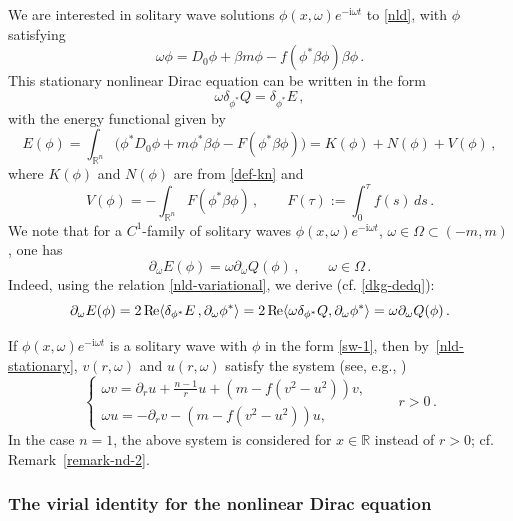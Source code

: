 \documentclass[12pt]{extarticle}
\newcommand{\jj}{\mathrm{i}}
\newcommand{\p}{\partial}
\def\R{\mathbb{R}}
\theoremstyle{plain}
\theoremstyle{remark}
\renewcommand{\Re}{\mathop{\rm{R\hskip -1pt e}}\nolimits}
\begin{document}
We are interested in solitary wave solutions
$\phi(x,\omega)e^{-\jj\omega t}$
to \eqref{nld},
with $\phi$ satisfying
\begin{equation}\label{nld-stationary}
    \omega\phi=D_0\phi+\beta m\phi-f( \phi^*\beta\phi)\beta\phi\,.
\end{equation}
This stationary nonlinear Dirac equation
can be written in the form
\begin{equation}\label{nld-variational}
    \omega\delta_{\phi^*}Q = \delta_{\phi^*}E\,,
\end{equation}
with the energy functional
given by
\begin{equation}\label{def-E}
    E(\phi)
    =\int_{\R^n}
    \bigl(
    \phi^* D_0\phi
    +m \phi^*\beta\phi
    -F( \phi^*\beta\phi)
    \bigr)
    =K(\phi)+N(\phi)+V(\phi)\,,
\end{equation}
where
$K(\phi)$ and $N(\phi)$ are from
\eqref{def-kn}
and
\[
    V(\phi)
    =-\int_{\R^n}
    F( \phi^*\beta\phi)\,,
    \qquad
    F(\tau):=\int_0^\tau f(s)\,ds\,.
\]
We note that
for a $C^1$-family of solitary waves
$\phi(x,\omega)e^{-\jj\omega t}$,
$\omega\in\Omega\subset(-m,m)$,
one has
\[
    \p_\omega E(\phi) = \omega \p_\omega Q(\phi)\,,
    \qquad
    \omega\in\Omega\,.
\]
Indeed, using the relation
\eqref{nld-variational},
we derive (cf. \eqref{dkg-dedq}):
\[
    \p_\omega E(\phi)
    =
    2\Re\langle\delta_{\phi^*}E\,,
    \p_\omega
    \phi^*\rangle
    =2 \Re\langle\omega\delta_{\phi^*}Q,\p_\omega\phi^*\rangle
    =
    \omega\p_\omega Q(\phi)\,.
\]

If $\phi(x,\omega)e^{-\jj\omega t}$
is a solitary wave
with $\phi$ in the form \eqref{sw-1},
then by~\eqref{nld-stationary},
$v(r,\omega)$ and $u(r,\omega)$ satisfy the system
(see, e.g.,
\cite{esteban1995stationary,boussaid2017nonrelativistic})
\begin{equation}\label{nld-stationary-1}
    \begin{cases}
        \omega v=\p_r u+\frac{n-1}{r}u+(m-f(v^2-u^2))v, \\
        \omega u=-\p_r v-(m-f(v^2-u^2))u,
    \end{cases}
    \qquad
    r>0\,.
\end{equation}
In the case $n=1$,
the above system is considered
for $x\in\R$ instead of $r>0$;
cf. Remark~\ref{remark-nd-2}.

\subsubsection*{The virial identity
for the nonlinear Dirac equation}
\end{document}
